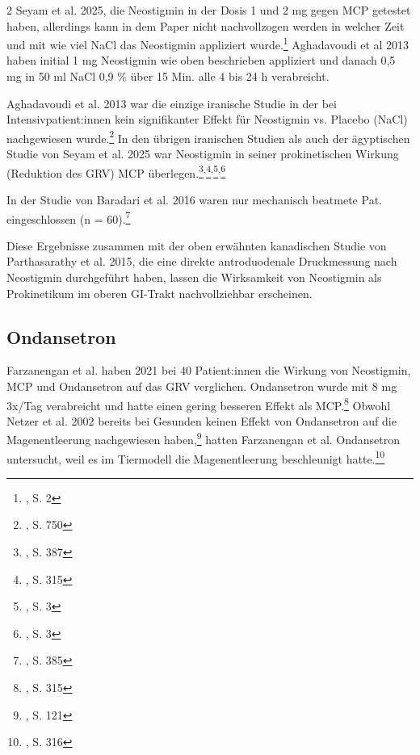 \documentclass{article}
\begin{document}
\begin{multicols}{2}
  Seyam et al. 2025, die Neostigmin in der Dosis 1 und 2 mg gegen MCP getestet haben, allerdings kann in dem Paper nicht nachvollzogen werden in welcher Zeit und mit wie viel NaCl das Neostigmin appliziert wurde.\footnote{\cite{seyam2025EffectTwoDifferent}, S. 2} Aghadavoudi et al 2013 haben initial 1 mg Neostigmin wie oben beschrieben appliziert und danach 0,5 mg in 50 ml NaCl 0,9 \% über 15 Min. alle 4 bis 24 h verabreicht.   

  Aghadavoudi et al. 2013 war die einzige iranische Studie in der bei Intensivpatient:innen kein signifikanter Effekt für Neostigmin vs. Placebo (NaCl) nachgewiesen wurde.\footnote{\cite{aghadavoudi2013EvaluationIntravenousNeostigmine}, S. 750} 
  In den übrigen iranischen Studien als auch der ägyptischen Studie von Seyam et al. 2025 war Neostigmin in seiner prokinetischen Wirkung (Reduktion des GRV) MCP überlegen.\footnote{\cite{baradari2016DoubleblindRandomizedClinical}, S. 387}\textsuperscript{,}\footnote{\cite{farzanegan2021MeasurementGastricResidual}, S. 315}\textsuperscript{,}\footnote{\cite{rahat-dahmardeh2021ComparingEffectNeostigmine}, S. 3}\textsuperscript{,}\footnote{\cite{seyam2025EffectTwoDifferent}, S. 3}

  In der Studie von Baradari et al. 2016 waren nur mechanisch beatmete Pat. eingeschlossen (n = 60).\footnote{\cite{baradari2016DoubleblindRandomizedClinical}, S. 385}

  Diese Ergebnisse zusammen mit der oben erwähnten kanadischen Studie von Parthasarathy et al. 2015, die eine direkte antroduodenale Druckmessung nach Neostigmin durchgeführt haben, lassen die Wirksamkeit von Neostigmin als Prokinetikum im oberen GI-Trakt nachvollziehbar erscheinen. 

  \subsection{Ondansetron}%
  \label{sub:Ondansetron}
  Farzanengan et al. haben 2021 bei 40 Patient:innen die Wirkung von Neostigmin, MCP und Ondansetron auf das GRV verglichen. Ondansetron wurde mit 8 mg 3x/Tag verabreicht und hatte einen gering besseren Effekt als MCP.\footnote{\cite{farzanegan2021MeasurementGastricResidual}, S. 315} Obwohl Netzer et al. 2002 bereits bei Gesunden keinen Effekt von Ondansetron auf die Magenentleerung nachgewiesen haben,\footnote{\cite{netzer2002DoesIntravenousOndansetron}, S. 121} hatten Farzanengan et al. Ondansetron untersucht, weil es im Tiermodell die Magenentleerung beschleunigt hatte.\footnote{\cite{farzanegan2021MeasurementGastricResidual}, S. 316}    
\end{multicols}
\vspace{20 mm} %
\printbibliography
\end{document}
